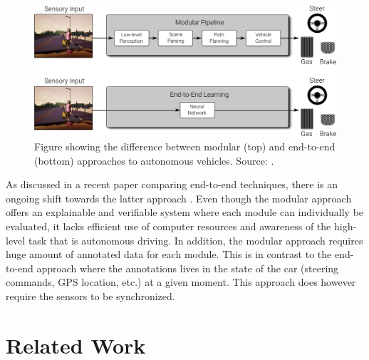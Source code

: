 \begin{figure}[htbp]
    \centering
    \includegraphics[width=\textwidth]{figures/2/modular-end-to-end.png}
    \caption{Figure showing the difference between modular (top) and end-to-end (bottom) approaches to autonomous vehicles. Source: \cite{computer-vision-for-autonomous-vehicles}.}
    \label{fig:modular-vs-end-to-end}
\end{figure}

As discussed in a recent paper comparing end-to-end techniques, there is an ongoing shift towards the latter approach \cite{survey-on-end-to-end-techniques}. Even though the modular approach offers an explainable and verifiable system where each module can individually be evaluated, it lacks efficient use of computer resources and awareness of the high-level task that is autonomous driving. In addition, the modular approach requires huge amount of annotated data for each module. This is in contrast to the end-to-end approach where the annotations lives in the state of the car (steering commands, GPS location, etc.) at a given moment. This approach does however require the sensors to be synchronized. 





\section{Related Work}
\label{sec:related-work}


